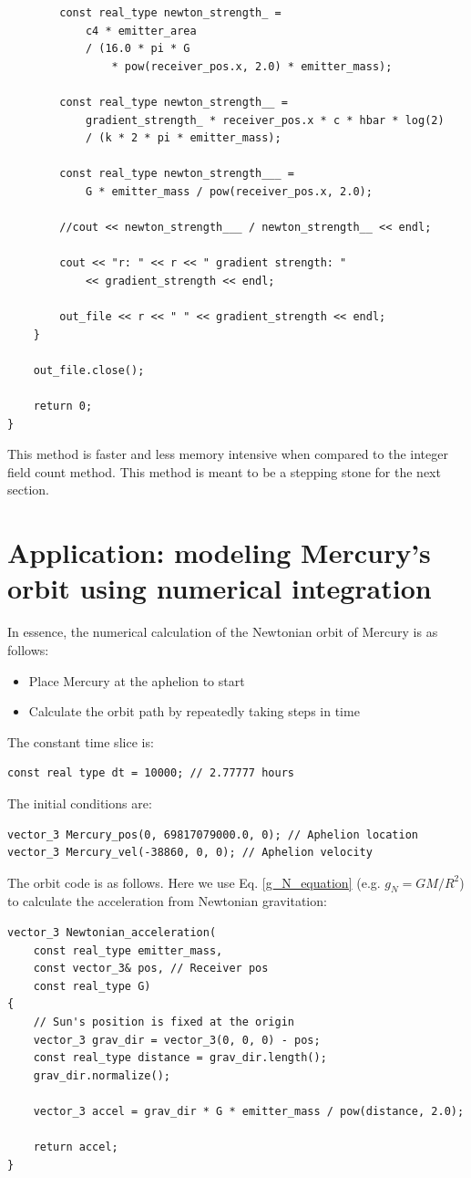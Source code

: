\documentclass[12pt]{article}
\begin{document}
\begin{lstlisting}
		const real_type newton_strength_ =
			c4 * emitter_area
			/ (16.0 * pi * G 
				* pow(receiver_pos.x, 2.0) * emitter_mass);

		const real_type newton_strength__ =
			gradient_strength_ * receiver_pos.x * c * hbar * log(2)
			/ (k * 2 * pi * emitter_mass);

		const real_type newton_strength___ =
			G * emitter_mass / pow(receiver_pos.x, 2.0);

		//cout << newton_strength___ / newton_strength__ << endl;

		cout << "r: " << r << " gradient strength: "
			<< gradient_strength << endl;

		out_file << r << " " << gradient_strength << endl;
	}

	out_file.close();

	return 0;
}
\end{lstlisting}

This method is faster and less memory intensive when compared to the integer field count method.
This method is meant to be a stepping stone for the next section.




\section{Application: modeling Mercury's orbit using numerical integration}

In essence, the numerical calculation of the Newtonian orbit of Mercury is as follows:
\begin{itemize}
\item Place Mercury at the aphelion to start
\item Calculate the orbit path by repeatedly taking steps in time
\end{itemize}

The constant time slice is:
\begin{lstlisting}
const real type dt = 10000; // 2.77777 hours
\end{lstlisting}

The initial conditions are:
\begin{lstlisting}
vector_3 Mercury_pos(0, 69817079000.0, 0); // Aphelion location
vector_3 Mercury_vel(-38860, 0, 0); // Aphelion velocity
\end{lstlisting}

The orbit code is as follows. 
Here we use Eq. \ref{g_N_equation} (e.g. $g_N = {G M}/{R^2}$) to calculate the acceleration from Newtonian gravitation:
\begin{lstlisting}
vector_3 Newtonian_acceleration(
	const real_type emitter_mass,
	const vector_3& pos, // Receiver pos
	const real_type G)
{
	// Sun's position is fixed at the origin
	vector_3 grav_dir = vector_3(0, 0, 0) - pos;
	const real_type distance = grav_dir.length();
	grav_dir.normalize();

	vector_3 accel = grav_dir * G * emitter_mass / pow(distance, 2.0);

	return accel;
}
\end{lstlisting}
\end{document}
